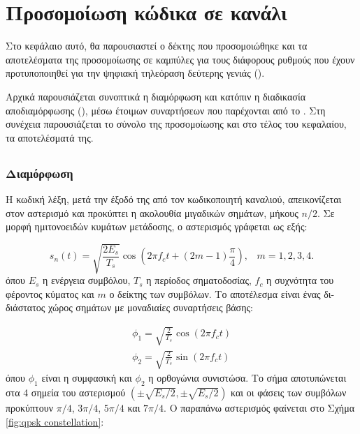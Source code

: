 \chapter{Προσομοίωση  κώδικα σε κανάλι }

Στο κεφάλαιο αυτό, θα παρουσιαστεί ο δέκτης που προσομοιώθηκε και τα αποτελέσματα της προσομοίωσης σε καμπύλες  για τους διάφορους ρυθμούς που έχουν προτυποποιηθεί για την ψηφιακή τηλεόραση δεύτερης γενιάς ().

Αρχικά παρουσιάζεται συνοπτικά η διαμόρφωση  και κατόπιν η διαδικασία αποδιαμόρφωσης (), μέσω έτοιμων συναρτήσεων που παρέχονται από το . Στη συνέχεια παρουσιάζεται το σύνολο της προσομοίωσης και στο τέλος του κεφαλαίου, τα αποτελέσματά της.

\section{}
\subsection{Διαμόρφωση }
Η κωδική λέξη, μετά την έξοδό της από τον κωδικοποιητή καναλιού, απεικονίζεται στον  αστερισμό και προκύπτει η ακολουθία μιγαδικών σημάτων, μήκους $n/2$. Σε μορφή ημιτονοειδών κυμάτων μετάδοσης, ο  αστερισμός γράφεται ως εξής:

\begin{equation}
s_n(t)=\sqrt{\frac{2E_s}{T_s}}\cos\left(2{\pi}f_ct+(2m-1)\frac{\pi}{4}\right),\;\;\;m=1,2,3,4.
\label{eq:QPSK sinusoid waves}
\end{equation}
όπου $E_s$ η ενέργεια συμβόλου, $T_s$ η περίοδος σηματοδοσίας, $f_c$ η συχνότητα του φέροντος κύματος και $m$ ο δείκτης των συμβόλων. Το αποτέλεσμα είναι ένας δι-διάστατος χώρος σημάτων με μοναδιαίες συναρτήσεις βάσης:

\begin{equation}
\begin{aligned}
\phi_1=\sqrt{\frac{2}{T_s}}\cos(2{\pi}f_ct) \\ \phi_2=\sqrt{\frac{2}{T_s}}\sin(2{\pi}f_ct)
\end{aligned}
\label{eq:QPSK base functions}
\end{equation}
όπου $\phi_1$ είναι η συμφασική και $\phi_2$ η ορθογώνια συνιστώσα. Το σήμα αποτυπώνεται στα 4 σημεία του αστερισμού  $\left(\pm\sqrt{E_s/2},\pm\sqrt{E_s/2}\right)$ και οι φάσεις των συμβόλων προκύπτουν $\pi/4$, $3\pi/4$, $5\pi/4$ και $7\pi/4$. Ο παραπάνω αστερισμός φαίνεται στο Σχήμα \ref{fig:qpsk constellation}:

